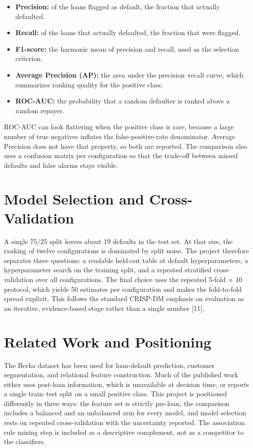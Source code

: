 \begin{itemize}
    \item \textbf{Precision:} of the loans flagged as default, the fraction that actually defaulted.
    \item \textbf{Recall:} of the loans that actually defaulted, the fraction that were flagged.
    \item \textbf{F1-score:} the harmonic mean of precision and recall, used as the selection criterion.
    \item \textbf{Average Precision (AP):} the area under the precision--recall curve, which summarizes ranking quality for the positive class.
    \item \textbf{ROC-AUC:} the probability that a random defaulter is ranked above a random repayer.
\end{itemize}

ROC-AUC can look flattering when the positive class is rare, because a large number of true negatives inflates the false-positive-rate denominator. Average Precision does not have that property, so both are reported. The comparison also uses a confusion matrix per configuration so that the trade-off between missed defaults and false alarms stays visible.

\section{Model Selection and Cross-Validation}
A single 75/25 split leaves about 19 defaults in the test set. At that size, the ranking of twelve configurations is dominated by split noise. The project therefore separates three questions: a readable held-out table at default hyperparameters, a hyperparameter search on the training split, and a repeated stratified cross-validation over all configurations. The final choice uses the repeated 5-fold $\times$ 10 protocol, which yields 50 estimates per configuration and makes the fold-to-fold spread explicit. This follows the standard CRISP-DM emphasis on evaluation as an iterative, evidence-based stage rather than a single number [11].

\section{Related Work and Positioning}
The Berka dataset has been used for loan-default prediction, customer segmentation, and relational feature construction. Much of the published work either uses post-loan information, which is unavailable at decision time, or reports a single train--test split on a small positive class. This project is positioned differently in three ways: the feature set is strictly pre-loan, the comparison includes a balanced and an unbalanced arm for every model, and model selection rests on repeated cross-validation with the uncertainty reported. The association rule mining step is included as a descriptive complement, not as a competitor to the classifiers.

